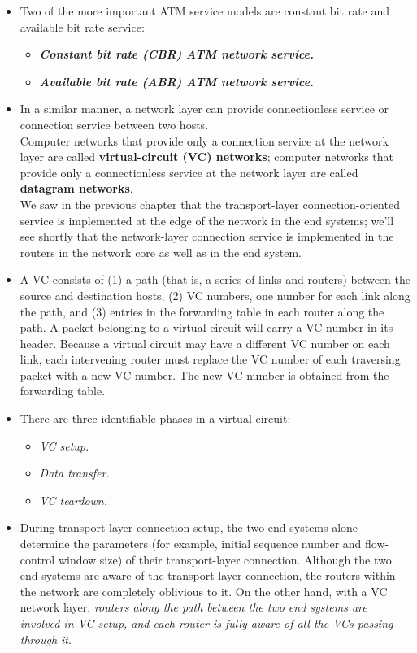 \begin{itemize}
\item
Two of the more important ATM service models are constant bit rate and available bit rate service:
\begin{itemize}
\item\textit{\textbf{Constant bit rate (CBR) ATM network service.}}
\item\textit{\textbf{Available bit rate (ABR) ATM network service.}}
\end{itemize}

\item
In a similar manner, a network layer can provide connectionless service or connection service between two hosts.\\
Computer networks that provide only a connection service at the network layer are called \textbf{virtual-circuit (VC) networks}; computer networks that provide only a connectionless service at the network layer are called \textbf{datagram networks}.\\
We saw in the previous chapter that the transport-layer connection-oriented service is implemented at the edge of the network in the end systems; we'll see shortly that the network-layer connection service is implemented in the routers in the network core as well as in the end system.

\item
A VC consists of (1) a path (that is, a series of links and routers) between the source and destination hosts, (2) VC numbers, one number for each link along the path, and (3) entries in the forwarding table in each router along the path. A packet belonging to a virtual circuit will carry a VC number in its header. Because a virtual circuit may have a different VC number on each link, each intervening router must replace the VC number of each traversing packet with a new VC number. The new VC number is obtained from the forwarding table.

\item
There are three identifiable phases in a virtual circuit:
\begin{itemize}
\item\textit{VC setup.}
\item\textit{Data transfer.}
\item\textit{VC teardown.}
\end{itemize}

\item
During transport-layer connection setup, the two end systems alone determine the parameters (for example, initial sequence number and flow-control window size) of their transport-layer connection. Although the two end systems are aware of the transport-layer connection, the routers within the network are completely oblivious to it. On the other hand, with a VC network layer, \textit{routers along the path between the two end systems are involved in VC setup, and each router is fully aware of all the VCs passing through it}.


\end{itemize}
